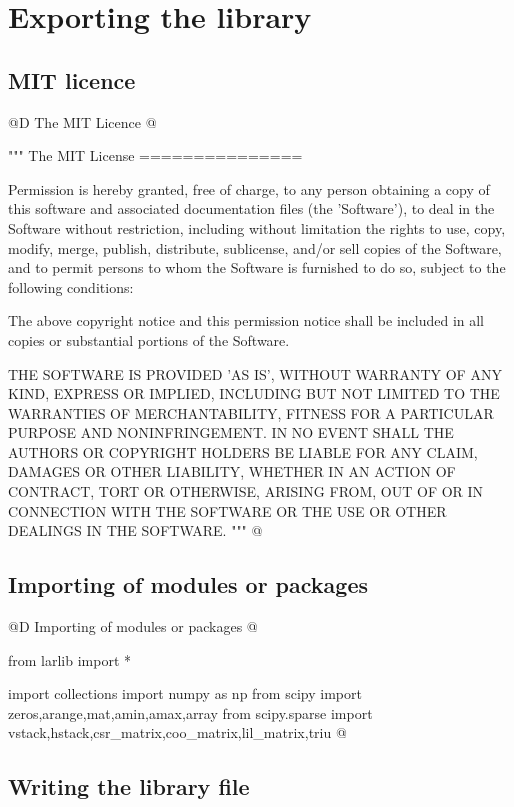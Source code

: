 \documentclass[11pt,oneside]{article}    %
\begin{document}


\section{Exporting the library}

\subsection{MIT licence}
@D The MIT Licence
@{
"""
The MIT License
===============
    
Permission is hereby granted, free of charge, to any person obtaining
a copy of this software and associated documentation files (the
'Software'), to deal in the Software without restriction, including
without limitation the rights to use, copy, modify, merge, publish,
distribute, sublicense, and/or sell copies of the Software, and to
permit persons to whom the Software is furnished to do so, subject to
the following conditions:

The above copyright notice and this permission notice shall be
included in all copies or substantial portions of the Software.

THE SOFTWARE IS PROVIDED 'AS IS', WITHOUT WARRANTY OF ANY KIND,
EXPRESS OR IMPLIED, INCLUDING BUT NOT LIMITED TO THE WARRANTIES OF
MERCHANTABILITY, FITNESS FOR A PARTICULAR PURPOSE AND NONINFRINGEMENT.
IN NO EVENT SHALL THE AUTHORS OR COPYRIGHT HOLDERS BE LIABLE FOR ANY
CLAIM, DAMAGES OR OTHER LIABILITY, WHETHER IN AN ACTION OF CONTRACT,
TORT OR OTHERWISE, ARISING FROM, OUT OF OR IN CONNECTION WITH THE
SOFTWARE OR THE USE OR OTHER DEALINGS IN THE SOFTWARE.
"""
@}
\subsection{Importing of modules or packages}
@D Importing of modules or packages
@{from larlib import *

import collections
import numpy as np
from scipy import zeros,arange,mat,amin,amax,array
from scipy.sparse import vstack,hstack,csr_matrix,coo_matrix,lil_matrix,triu
@}

\subsection{Writing the library file}
\end{document}
